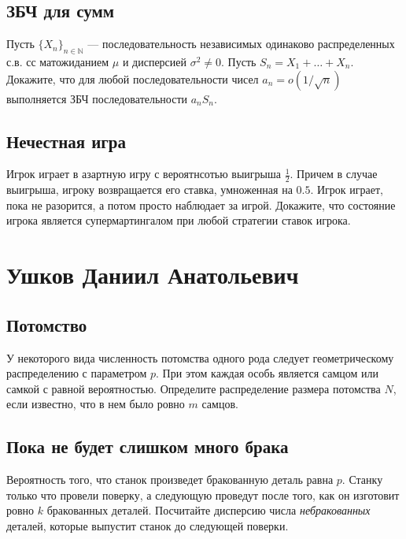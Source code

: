 \documentclass[12pt]{article}
\newcommand\N{\mathbb{N}}
\begin{document}
\subsection{ЗБЧ для сумм}
Пусть $\{X_n\}_{n \in \N}$ --- последовательность независимых одинаково распределенных с.в. сс матожиданием $\mu$ и дисперсией $\sigma^2 \ne 0$. Пусть $S_n = X_1 + \dots + X_n$. Докажите, что для любой последовательности чисел $a_n = o(1/\sqrt{n})$ выполняется ЗБЧ последовательности $a_n S_n$.



\subsection{Нечестная игра}

Игрок играет в азартную игру с вероятнсотью выигрыша $\frac{1}{2}$. Причем в случае выигрыша, игроку возвращается его ставка, умноженная на $0.5$. Игрок играет, пока не разорится, а потом просто наблюдает за игрой. Докажите, что состояние игрока является супермартингалом при любой стратегии ставок игрока.



\newpage
\section{Ушков Даниил Анатольевич}

\subsection{Потомство}

У некоторого вида численность потомства одного рода следует геометрическому распределению с параметром $p$. При этом каждая особь является самцом или самкой с равной вероятностью. Определите распределение размера потомства $N$, если известно, что в нем было ровно $m$ самцов.



\subsection{Пока не будет слишком много брака}

Вероятность того, что станок произведет бракованную деталь равна $p$. Станку только что провели поверку, а следующую проведут после того, как он изготовит ровно $k$ бракованных деталей. Посчитайте дисперсию числа \emph{небракованных} деталей, которые выпустит станок до следующей поверки.
\end{document}
